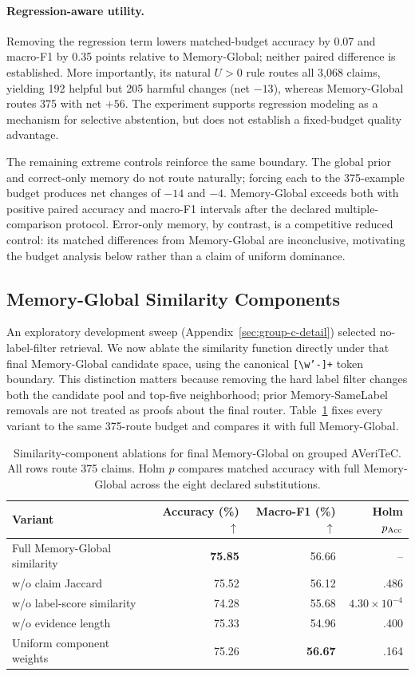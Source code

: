 \documentclass[runningheads]{llncs}
\begin{document}
\paragraph{Regression-aware utility.}
Removing the regression term lowers matched-budget accuracy by 0.07 and
macro-F1 by 0.35 points relative to Memory-Global; neither paired difference
is established. More importantly, its natural $U>0$ rule routes all 3,068
claims, yielding 192 helpful but 205 harmful changes (net $-13$), whereas Memory-Global
routes 375 with net $+56$. The experiment supports regression modeling as a
mechanism for selective abstention, but does not establish a fixed-budget
quality advantage.

The remaining extreme controls reinforce the same boundary. The global prior
and correct-only memory do not route naturally; forcing each to the
375-example budget produces net changes of $-14$ and $-4$. Memory-Global exceeds both
with positive paired accuracy and macro-F1 intervals after the declared
multiple-comparison protocol. Error-only memory, by contrast, is a
competitive reduced control: its matched differences from Memory-Global are
inconclusive, motivating the budget analysis below rather than a claim of
uniform dominance.

\subsection{Memory-Global Similarity Components}
\label{sec:group-c-ablation}

An exploratory development sweep (Appendix~\ref{sec:group-c-detail}) selected
no-label-filter retrieval. We now ablate
the similarity function directly under that final Memory-Global candidate space, using
the canonical \texttt{[\textbackslash w'-]+} token boundary. This distinction
matters because removing the hard label filter changes both the candidate pool
and top-five neighborhood; prior Memory-SameLabel removals are not treated as
proofs about the final router. Table~\ref{tab:nc-main} fixes every variant to
the same 375-route budget and compares it with full Memory-Global.

\begin{table}[t]
\caption{Similarity-component ablations for final Memory-Global on grouped
AVeriTeC. All rows route 375 claims. Holm $p$ compares matched accuracy with
full Memory-Global across the eight declared substitutions.}
\label{tab:nc-main}
\centering\small
\begin{tabular}{lrrr}
\toprule
Variant & Accuracy (\%) $\uparrow$ & Macro-F1 (\%) $\uparrow$ & Holm $p_{\rm Acc}$ \\
\midrule
Full Memory-Global similarity & \textbf{75.85} & 56.66 & -- \\
w/o claim Jaccard & 75.52 & 56.12 & .486 \\
w/o label-score similarity & 74.28 & 55.68 & $4.30{\times}10^{-4}$ \\
w/o evidence length & 75.33 & 54.96 & .400 \\
Uniform component weights & 75.26 & \textbf{56.67} & .164 \\
\bottomrule
\end{tabular}
\end{table}
\end{document}
